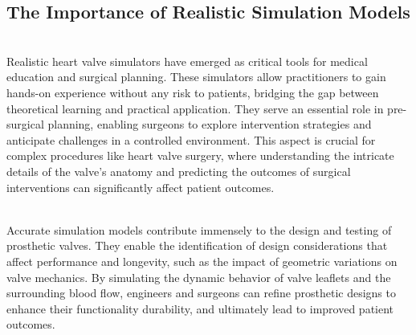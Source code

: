 \subsection{The Importance of Realistic Simulation Models}
\\
Realistic heart valve simulators have emerged as critical tools for medical education and surgical planning. These simulators allow practitioners to gain hands-on experience without any risk to patients, bridging the gap between theoretical learning and practical application. They serve an essential role in pre-surgical planning, enabling surgeons to explore intervention strategies and anticipate challenges in a controlled environment. This aspect is crucial for complex procedures like heart valve surgery, where understanding the intricate details of the valve's anatomy and predicting the outcomes of surgical interventions can significantly affect patient outcomes.


\\
Accurate simulation models contribute immensely to the design and testing of prosthetic valves. They enable the identification of design considerations that affect performance and longevity, such as the impact of geometric variations on valve mechanics. By simulating the dynamic behavior of valve leaflets and the surrounding blood flow, engineers and surgeons can refine prosthetic designs to enhance their functionality durability, and ultimately lead to improved patient outcomes.



